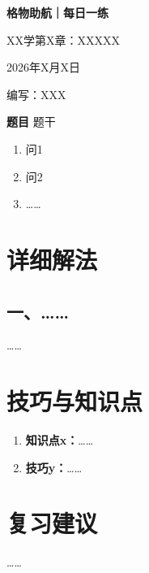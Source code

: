 \documentclass[11pt,a4paper]{ctexart}
\begin{document}
\begin{center}
  {\Large\bfseries\color{mainblue} 格物助航｜每日一练}\par
  \vspace{0.25em}
  {\large XX学第X章：XXXXX}\par
  \vspace{0.35em}
  {\small 2026年X月X日}\par
  \vspace{0.35em}
  {\small 编写：XXX}
\end{center}

\vspace{-0.3em}

\begin{problemBox}
\noindent\textbf{题目}\quad
题干
\begin{enumerate}
  \item 问1
  \item 问2
  \item ……
\end{enumerate}
\end{problemBox}


\section*{详细解法}

\subsection*{一、……}

……

\section*{技巧与知识点}

\begin{tipBox}
\begin{enumerate}
  \item \textbf{知识点x：}……
  \item \textbf{技巧y：}……
\end{enumerate}
\end{tipBox}

\section*{复习建议}

……
\end{document}
